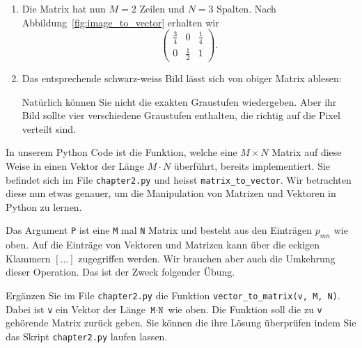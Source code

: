 \begin{losung}
	\begin{enumerate}[label=(\alph*)]
		\item Die Matrix hat nun $M=2$ Zeilen und $N=3$ Spalten. Nach Abbildung~\ref{fig:image_to_vector} erhalten wir
		\begin{equation*}
			\begin{pmatrix}
				\frac{3}{4} & 0 & \frac{1}{4} \\
				0 & \frac{1}{2} & 1
			\end{pmatrix}.
		\end{equation*}
		\item Das entsprechende schwarz-weiss Bild lässt sich von obiger Matrix ablesen:
		
		\begin{center}
		\end{center}

		Natürlich können Sie nicht die exakten Graustufen wiedergeben.
		Aber ihr Bild sollte vier verschiedene Graustufen enthalten, die richtig auf die Pixel verteilt sind.
	\end{enumerate}
\end{losung}
In unserem Python Code ist die Funktion, welche eine $M\times N$ Matrix auf diese Weise in einen Vektor der Länge $M\cdot N$ überführt, bereits implementiert.
Sie befindet sich im File \texttt{chapter2.py} und heisst \texttt{matrix\_to\_vector}.
Wir betrachten diese nun etwas genauer, um die Manipulation von Matrizen und Vektoren in Python zu lernen.

Das Argument \texttt{P} ist eine \texttt{M} mal \texttt{N} Matrix und besteht aus den Einträgen $p_{mn}$ wie oben.
Auf die Einträge von Vektoren und Matrizen kann über die eckigen Klammern $[\ldots]$ zugegriffen werden.
Wir brauchen aber auch die Umkehrung dieser Operation.
Das ist der Zweck folgender Übung.
\begin{aufgabe} \label{aufg:vectormatrix_code}
	Ergänzen Sie im File \texttt{chapter2.py} die Funktion \texttt{vector\_to\_matrix(v, M, N)}.
	Dabei ist \texttt{v} ein Vektor der Länge $\texttt{M}\cdot\texttt{N}$ wie oben.
	Die Funktion soll die zu \texttt{v} gehörende Matrix zurück geben.
	Sie können die ihre Lösung überprüfen indem Sie das Skript \texttt{chapter2.py} laufen lassen.
\end{aufgabe}

